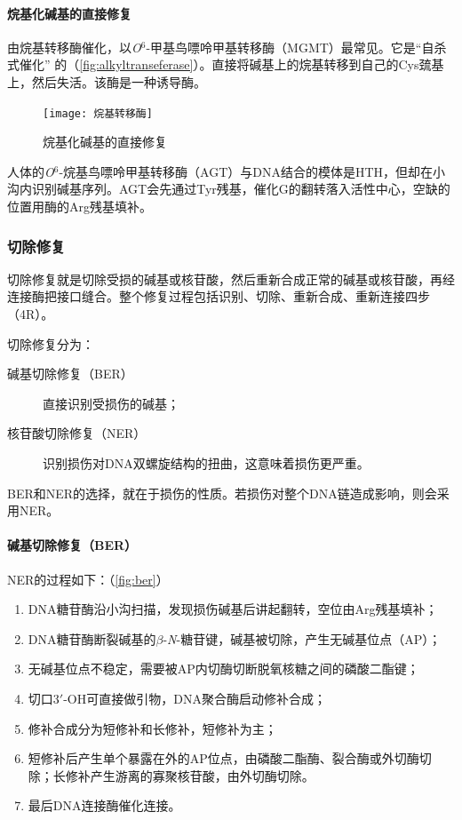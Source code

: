 \paragraph{烷基化碱基的直接修复}

由烷基转移酶催化，以\textit{O}$^{6}$-甲基鸟嘌呤甲基转移酶（MGMT）最常见。它是“自杀式催化” 的（\autoref{fig:alkyltranseferase}）。直接将碱基上的烷基转移到自己的Cys巯基上，然后失活。该酶是一种诱导酶。

\begin{figure}
	\centering
	\texttt{[image: 烷基转移酶]}
	\caption{烷基化碱基的直接修复}
	\label{fig:alkyltranseferase}
\end{figure}

人体的\textit{O}$^{6}$-烷基鸟嘌呤甲基转移酶（AGT）与DNA结合的模体是HTH，但却在小沟内识别碱基序列。AGT会先通过Tyr残基，催化G的翻转落入活性中心，空缺的位置用酶的Arg残基填补。

\subsubsection{切除修复}

切除修复就是切除受损的碱基或核苷酸，然后重新合成正常的碱基或核苷酸，再经连接酶把接口缝合。整个修复过程包括识别、切除、重新合成、重新连接四步（4R）。

切除修复分为：\begin{description}
	\item[碱基切除修复（BER）] 直接识别受损伤的碱基；
	\item[核苷酸切除修复（NER）] 识别损伤对DNA双螺旋结构的扭曲，这意味着损伤更严重。
\end{description}

BER和NER的选择，就在于损伤的性质。若损伤对整个DNA链造成影响，则会采用NER。

\paragraph{碱基切除修复（BER）}

NER的过程如下：（\autoref{fig:ber}）

\begin{enumerate}
	\item DNA糖苷酶沿小沟扫描，发现损伤碱基后讲起翻转，空位由Arg残基填补；
	\item DNA糖苷酶断裂碱基的$\beta$-\textit{N}-糖苷键，碱基被切除，产生无碱基位点（AP）；
	\item 无碱基位点不稳定，需要被AP内切酶切断脱氧核糖之间的磷酸二酯键；
	\item 切口3$\prime$-OH可直接做引物，DNA聚合酶启动修补合成；
	\item 修补合成分为短修补和长修补，短修补为主；
	\item 短修补后产生单个暴露在外的AP位点，由磷酸二酯酶、裂合酶或外切酶切除；长修补产生游离的寡聚核苷酸，由外切酶切除。
	\item 最后DNA连接酶催化连接。
\end{enumerate}

